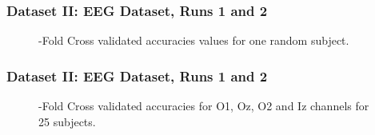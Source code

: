 \documentclass[aspectratio=169]{beamer}
\begin{document}
    
    \begin{frame}
      \frametitle{Dataset II: EEG Dataset, Runs 1 and 2 }
   \begin{figure}[thpb]
      \centering
      \setlength\fboxsep{0pt}
	  \setlength\fboxrule{0.5pt}
      \caption{-Fold Cross validated accuracies values for one random subject.}
      \label{figure2}
   \end{figure}          
    \end{frame}    

    \begin{frame}
    \frametitle{Dataset II: EEG Dataset, Runs 1 and 2 }
   \begin{figure}[thpb]
      \centering
      \setlength\fboxsep{0pt}
	  \setlength\fboxrule{0.5pt}
      \caption{-Fold Cross validated accuracies for O1, Oz, O2 and Iz channels for 25 subjects.}
      \label{figure2}
   \end{figure}          
    \end{frame}            
        
\end{document}
